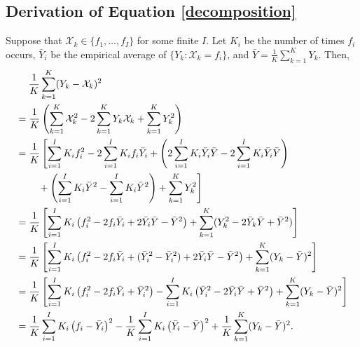 \documentclass[11pt]{article}
\theoremstyle{definition}
\theoremstyle{definition}
\begin{document}
\subsection{Derivation of Equation \ref{decomposition}}
Suppose that $\mathcal{X}_k \in \{f_1, \dots, f_I\}$ for some finite $I$. Let $K_i$ be the number of times $f_i$ occurs, $\bar{Y}_i$ be the empirical average of $\{Y_k : \mathcal{X}_k = f_i\}$, and $\bar{Y} = \frac{1}{K} \sum_{k=1}^K Y_k$. Then,
\begin{align*}
&\hspace{1.3em}  \frac{1}{K} \sum_{k=1}^K (Y_k - \mathcal{X}_k)^2\\
 &= \frac{1}{K} \left( \sum_{k=1}^K \mathcal{X}_k^2 - 2\sum_{k=1}^KY_k\mathcal{X}_k + \sum_{k=1}^KY_k^2 \right)\\
 &= \frac{1}{K} \left[ \sum_{i=1}^I K_i f_i^2 - 2\sum_{i=1}^I K_i f_i \bar{Y}_i + \left( 2 \sum_{i=1}^IK_i\bar{Y}_i\bar{Y}- 2 \sum_{i=1}^IK_i\bar{Y}_i\bar{Y} \right) \right. \\
 &\qquad \left. {} +  \left( \sum_{i=1}^IK_i\bar{Y}^2- \sum_{i=1}^IK_i\bar{Y}^2 \right) + \sum_{k=1}^KY_k^2 \right]\\
 &= \frac{1}{K} \left[ \sum_{i=1}^I K_i \left( f_i^2 - 2 f_i \bar{Y}_i + 2 \bar{Y}_i\bar{Y}-  \bar{Y}^2 \right) + \sum_{k=1}^K(Y_k^2 -2\bar{Y}_k\bar{Y}+ \bar{Y}^2) \right]\\
 &= \frac{1}{K} \left[ \sum_{i=1}^I K_i \left( f_i^2 - 2 f_i \bar{Y}_i + (\bar{Y}_i^2 - \bar{Y}_i^2) + 2 \bar{Y}_i\bar{Y}-  \bar{Y}^2 \right) + \sum_{k=1}^K(Y_k -\bar{Y})^2 \right]\\
 &= \frac{1}{K} \left[ \sum_{i=1}^I K_i \left( f_i^2 - 2 f_i \bar{Y}_i + \bar{Y}_i^2 \right)  - \sum_{i=1}^I K_i  \left(\bar{Y}_i^2 - 2 \bar{Y}_i\bar{Y} + \bar{Y}^2 \right) + \sum_{k=1}^K(Y_k -\bar{Y})^2 \right]\\
 &=  \frac{1}{K} \sum_{i=1}^I K_i \left( f_i - \bar{Y}_i \right)^2  - \frac{1}{K} \sum_{i=1}^I K_i  \left(\bar{Y}_i - \bar{Y} \right)^2 + \frac{1}{K} \sum_{k=1}^K(Y_k -\bar{Y})^2.
\end{align*}





%

\end{document}
